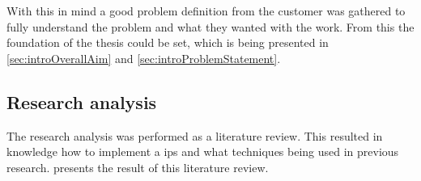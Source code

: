 \bigskip

With this in mind a good problem definition from the customer was gathered to fully understand the problem and what they wanted with the work.
From this the foundation of the thesis could be set, which is being presented in \cref{sec:introOverallAim} and \ref{sec:introProblemStatement}.


\subsection{Research analysis}\label{sec:}
The research analysis was performed as a literature review. 
This resulted in knowledge how to implement a \acrfull{ips} and what techniques being used in previous research.
 presents the result of this literature review.
